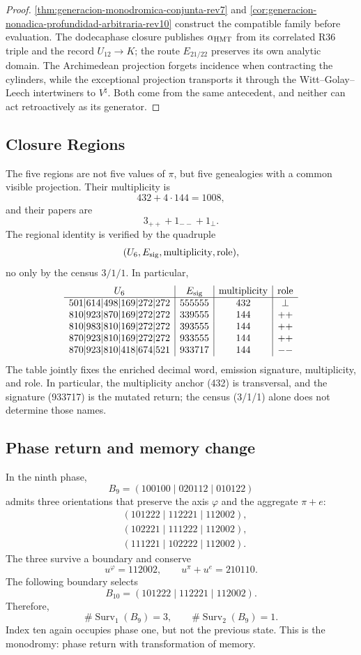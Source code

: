 \begin{proof}
\cref{thm:generacion-monodromica-conjunta-rev7} and
\cref{cor:generacion-nonadica-profundidad-arbitraria-rev10} construct the
compatible family before evaluation. The dodecaphase closure publishes
\(\alpha_{\rm HMT}\) from its correlated R36 triple and the record
\(U_{12}\to K\); the route
\(E_{21/22}\) preserves its own analytic domain. The Archimedean
projection forgets incidence when contracting the cylinders, while the
exceptional projection transports it through the Witt--Golay--
Leech intertwiners to \(V^\natural\). Both come from the same antecedent, and neither
can act retroactively as its generator.
\end{proof}

\subsection{Closure Regions}

The five regions are not five values of \(\pi\), but five genealogies
with a common visible projection. Their multiplicity is
\[
 432+4\cdot144=1008,
\]
and their papers are
\[
 3_{++}+1_{--}+1_{\perp}.
\]
The regional identity is verified by the quadruple
\[
 (U_6,E_{\rm sig},\text{multiplicity},\text{role}),
\]
no only by the census \(3/1/1\). In particular,
\[
\begin{array}{c|c|c|c}
U_6&E_{\rm sig}&\text{multiplicity}&\text{role}\\ \hline
501|614|498|169|272|272&555555&432&\perp\\
810|923|870|169|272|272&339555&144&++\\
810|983|810|169|272|272&393555&144&++\\
870|923|810|169|272|272&933555&144&++\\
870|923|810|418|674|521&933717&144&--
\end{array}
\]
The table jointly fixes the enriched decimal word, emission signature,
multiplicity, and role. In particular, the multiplicity anchor (432) is
transversal, and the signature (933717) is the mutated return; the census (3/1/1)
alone does not determine those names.

\subsection{Phase return and memory change}

In the ninth phase,
\[
 B_9=(100100\mid020112\mid010122)
\]
admits three orientations that preserve the axis \(\varphi\) and the aggregate
\(\pi+e\):
\[
\begin{aligned}
 &(101222\mid112221\mid112002),\\
 &(102221\mid111222\mid112002),\\
 &(111221\mid102222\mid112002).
\end{aligned}
\]
The three survive a boundary and conserve
\[
 u^{\varphi}=112002,
 \qquad u^\pi+u^e=210110.
\]
The following boundary selects
\[
 B_{10}=(101222\mid112221\mid112002).
\]
Therefore,
\[
 \#\operatorname{Surv}_1(B_9)=3,
 \qquad
 \#\operatorname{Surv}_2(B_9)=1.
\]
Index ten again occupies phase one, but not the previous state. This
is the monodromy: phase return with transformation of memory.

